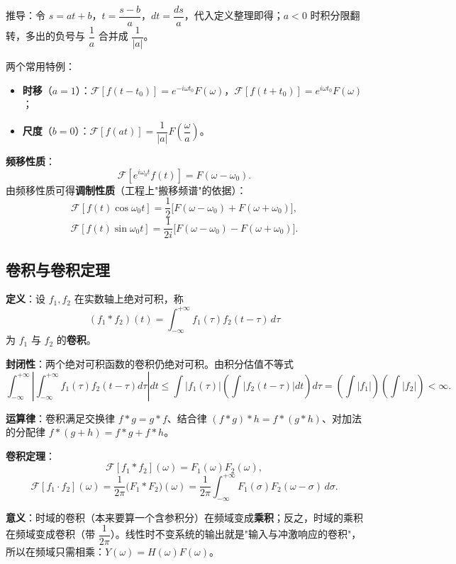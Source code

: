 推导：令 \(s=at+b\)，\(t=\dfrac{s-b}{a}\)，\(dt=\dfrac{ds}{a}\)，代入定义整理即得；\(a<0\) 时积分限翻转，多出的负号与 \(\dfrac{1}{a}\) 合并成 \(\dfrac{1}{|a|}\)。

两个常用特例：
\begin{itemize}
    \item \textbf{时移}（\(a=1\)）：\(\mathscr{F}[f(t-t_0)]=e^{-i\omega t_0}F(\omega)\)，\(\mathscr{F}[f(t+t_0)]=e^{i\omega t_0}F(\omega)\)；
    \item \textbf{尺度}（\(b=0\)）：\(\mathscr{F}[f(at)]=\dfrac{1}{|a|}F\!\left(\dfrac{\omega}{a}\right)\)。
\end{itemize}

\textbf{频移性质}：
\[
\mathscr{F}\left[e^{i\omega_0t}f(t)\right]=F(\omega-\omega_0).
\]
由频移性质可得\textbf{调制性质}（工程上"搬移频谱"的依据）：
\[
\mathscr{F}[f(t)\cos\omega_0t]=\frac{1}{2}\big[F(\omega-\omega_0)+F(\omega+\omega_0)\big],
\]
\[
\mathscr{F}[f(t)\sin\omega_0t]=\frac{1}{2i}\big[F(\omega-\omega_0)-F(\omega+\omega_0)\big].
\]


\subsection{卷积与卷积定理}

\textbf{定义}：设 \(f_1,f_2\) 在实数轴上绝对可积，称
\[
(f_1*f_2)(t)=\int_{-\infty}^{+\infty}f_1(\tau)f_2(t-\tau)\,d\tau
\]
为 \(f_1\) 与 \(f_2\) 的\textbf{卷积}。

\textbf{封闭性}：两个绝对可积函数的卷积仍绝对可积。由积分估值不等式
\[
\int_{-\infty}^{+\infty}\left|\int_{-\infty}^{+\infty}f_1(\tau)f_2(t-\tau)d\tau\right|dt
\le\int|f_1(\tau)|\left(\int|f_2(t-\tau)|dt\right)d\tau
=\left(\int|f_1|\right)\left(\int|f_2|\right)<\infty .
\]

\textbf{运算律}：卷积满足交换律 \(f*g=g*f\)、结合律 \((f*g)*h=f*(g*h)\)、对加法的分配律 \(f*(g+h)=f*g+f*h\)。

\textbf{卷积定理}：
\[
\mathscr{F}[f_1*f_2](\omega)=F_1(\omega)F_2(\omega),
\]
\[
\mathscr{F}[f_1\cdot f_2](\omega)=\frac{1}{2\pi}\big(F_1*F_2\big)(\omega)
=\frac{1}{2\pi}\int_{-\infty}^{+\infty}F_1(\sigma)F_2(\omega-\sigma)\,d\sigma .
\]

\textbf{意义}：时域的卷积（本来要算一个含参积分）在频域变成\textbf{乘积}；反之，时域的乘积在频域变成卷积（带 \(\dfrac{1}{2\pi}\)）。线性时不变系统的输出就是"输入与冲激响应的卷积"，所以在频域只需相乘：\(Y(\omega)=H(\omega)F(\omega)\)。

